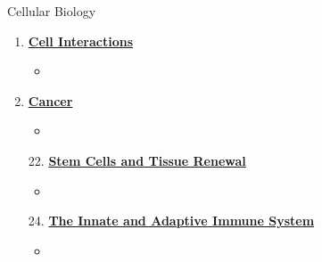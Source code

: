 \documentclass[12pt,letterpaper]{article}
\newcommand{\thetitle}{\hypertarget{home}{Cellular Biology}}
\begin{document}
\begin{contbox}{Cellular Biology}
{\begin{enumerate}[font=\bfseries, wide]
\begin{itemize}
        \item 
    \end{itemize}
    \item \hyperlink{19}{\textbf{Cell Interactions}}
    \begin{itemize}
        \item 
    \end{itemize}
    \item \hyperlink{20}{\textbf{Cancer}}
    \begin{itemize}
        \item 
    \end{itemize}    
    \item[22.] \hyperlink{22}{\textbf{Stem Cells and Tissue Renewal}}
    \begin{itemize}
        \item 
    \end{itemize}
    \item[24.] \hyperlink{24}{\textbf{The Innate and Adaptive Immune System}}
    \begin{itemize}
        \item 
    \end{itemize}
\end{enumerate}
}\end{contbox}




\clearpage
\renewcommand{\thetitle}{\hypertarget{10}{The Genetic Code of Genes
and Genomes}}
\hypertarget{10}{} 
\end{document}
